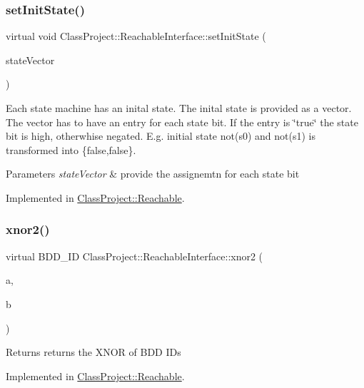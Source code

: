 \mbox{\label{classClassProject_1_1ReachableInterface_a005d8d8375b8d4e9f7c7d1a0ff01a97f}} 
\subsubsection{\texorpdfstring{set\+Init\+State()}{setInitState()}}
{\footnotesize\ttfamily virtual void Class\+Project\+::\+Reachable\+Interface\+::set\+Init\+State (\begin{DoxyParamCaption}\item[{const std\+::vector$<$ bool $>$ \&}]{state\+Vector }\end{DoxyParamCaption})\hspace{0.3cm}{\ttfamily [pure virtual]}}

Each state machine has an inital state. The inital state is provided as a vector. The vector has to have an entry for each state bit. If the entry is \char`\"{}true\char`\"{} the state bit is high, otherwhise negated. E.\+g. initial state not(s0) and not(s1) is transformed into \{false,false\}. 
\begin{DoxyParams}{Parameters}
{\em state\+Vector} & provide the assignemtn for each state bit \\
\hline
\end{DoxyParams}


Implemented in \hyperlink{classClassProject_1_1Reachable_ab3ddc3f569e280c3902a40ab8202f8c3}{Class\+Project\+::\+Reachable}.

\mbox{\label{classClassProject_1_1ReachableInterface_a80163dcb8b1d982b4fb7f8614808dece}} 
\subsubsection{\texorpdfstring{xnor2()}{xnor2()}}
{\footnotesize\ttfamily virtual B\+D\+D\+\_\+\+ID Class\+Project\+::\+Reachable\+Interface\+::xnor2 (\begin{DoxyParamCaption}\item[{B\+D\+D\+\_\+\+ID}]{a,  }\item[{B\+D\+D\+\_\+\+ID}]{b }\end{DoxyParamCaption})\hspace{0.3cm}{\ttfamily [pure virtual]}}

\begin{DoxyReturn}{Returns}
returns the X\+N\+OR of B\+DD I\+Ds 
\end{DoxyReturn}


Implemented in \hyperlink{classClassProject_1_1Reachable_a7f97f9868c825b64f333c4bc8eb7632b}{Class\+Project\+::\+Reachable}.

